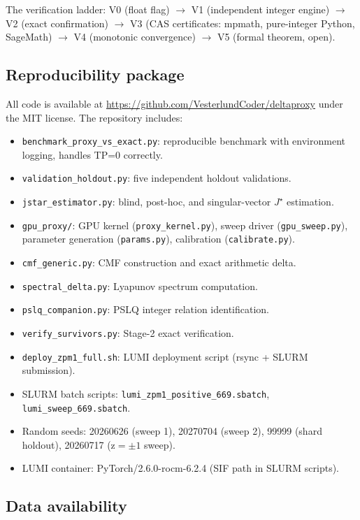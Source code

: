 \documentclass[11pt]{article}
\begin{document}
The verification ladder: V0 (float flag) $\to$ V1 (independent integer engine) $\to$ V2 (exact confirmation) $\to$ V3 (CAS certificates: mpmath, pure-integer Python, SageMath) $\to$ V4 (monotonic convergence) $\to$ V5 (formal theorem, open).

\subsection{Reproducibility package}

All code is available at \url{https://github.com/VesterlundCoder/deltaproxy} \cite{deltaproxy_repo} under the MIT license. The repository includes:

\begin{itemize}
\item \texttt{benchmark\_proxy\_vs\_exact.py}: reproducible benchmark with environment logging, handles TP=0 correctly.
\item \texttt{validation\_holdout.py}: five independent holdout validations.
\item \texttt{jstar\_estimator.py}: blind, post-hoc, and singular-vector $J^\star$ estimation.
\item \texttt{gpu\_proxy/}: GPU kernel (\texttt{proxy\_kernel.py}), sweep driver (\texttt{gpu\_sweep.py}), parameter generation (\texttt{params.py}), calibration (\texttt{calibrate.py}).
\item \texttt{cmf\_generic.py}: CMF construction and exact arithmetic delta.
\item \texttt{spectral\_delta.py}: Lyapunov spectrum computation.
\item \texttt{pslq\_companion.py}: PSLQ integer relation identification.
\item \texttt{verify\_survivors.py}: Stage-2 exact verification.
\item \texttt{deploy\_zpm1\_full.sh}: LUMI deployment script (rsync + SLURM submission).
\item SLURM batch scripts: \texttt{lumi\_zpm1\_positive\_669.sbatch}, \texttt{lumi\_sweep\_669.sbatch}.
\item Random seeds: 20260626 (sweep 1), 20270704 (sweep 2), 99999 (shard holdout), 20260717 (z$=\pm 1$ sweep).
\item LUMI container: PyTorch/2.6.0-rocm-6.2.4 (SIF path in SLURM scripts).
\end{itemize}

\subsection{Data availability}
\end{document}
